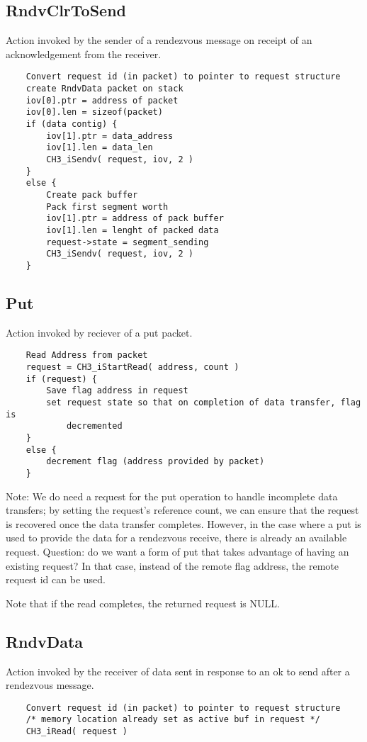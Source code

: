 \documentclass{article}
\begin{document}
\subsection{RndvClrToSend}
Action invoked by the sender of a rendezvous message on receipt of an
acknowledgement from the receiver.
\begin{verbatim}
    Convert request id (in packet) to pointer to request structure
    create RndvData packet on stack
    iov[0].ptr = address of packet
    iov[0].len = sizeof(packet)
    if (data contig) {
        iov[1].ptr = data_address
        iov[1].len = data_len
        CH3_iSendv( request, iov, 2 )
    }
    else {
        Create pack buffer
        Pack first segment worth
        iov[1].ptr = address of pack buffer
        iov[1].len = lenght of packed data
        request->state = segment_sending
        CH3_iSendv( request, iov, 2 )
    }
\end{verbatim}

\subsection{Put}
Action invoked by reciever of a put packet.  
\begin{verbatim}
    Read Address from packet
    request = CH3_iStartRead( address, count )
    if (request) {
        Save flag address in request
        set request state so that on completion of data transfer, flag is
            decremented
    }
    else {
        decrement flag (address provided by packet)
    }
\end{verbatim}
Note: We do need a request for the put operation to handle incomplete
data transfers; by setting the 
request's reference count, we can ensure that the request is recovered once
the data transfer completes.  However, in the case where a put is used to
provide the data for a rendezvous receive, there is already an available
request.  Question: do we want a form of put that takes advantage of having an
existing request?  In that case, instead of the remote flag address, the
remote request id can be used.

Note that if the read completes, the returned request is NULL.

\subsection{RndvData}
Action invoked by the receiver of data sent in response to an ok to send after
a rendezvous message.
\begin{verbatim}
    Convert request id (in packet) to pointer to request structure
    /* memory location already set as active buf in request */
    CH3_iRead( request )
\end{verbatim}
\end{document}
